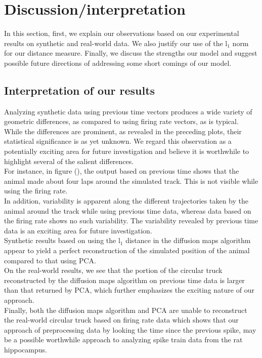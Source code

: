 \section{Discussion/interpretation}
In this section, first, we explain our observations based on our experimental
results on synthetic and real-world data. We also justify our use of the l$_{1}$ norm for our distance measure.
Finally, we discuss the strengths our model and suggest possible future directions of addressing some short comings of our model.


\subsection{Interpretation of our results}
Analyzing synthetic data using previous time vectors produces a wide variety of geometric differences, as compared to  using firing rate vectors, as is typical.
While the differences are prominent, as revealed in the preceding plots, their 
statistical significance is as yet unknown. We regard this observation as a potentially exciting area for future investigation and believe it is worthwhile 
to highlight several of the salient differences.\\

For instance, in figure (), the output based on previous time shows that 
the animal made about four laps around the  simulated track. This is not visible while using the firing rate.\\

In addition, variability is apparent along the different trajectories taken by the animal around the track while using previous time data, whereas data based on the firing rate shows no such variability. The variability revealed by previous time data is an exciting area for future investigation.\\

Synthetic results based on using the l$_{1}$ distance in the diffusion maps algorithm appear to yield a perfect reconstruction of the simulated position of the animal compared to that using PCA. \\

On the real-world results, we see that the portion of the circular truck reconstructed by the diffusion maps algorithm on previous time data is larger than that returned by PCA, which further emphasizes the exciting nature of our approach.\\

Finally, both the diffusion maps algorithm and PCA are unable to reconstruct the real-world circular truck based on firing rate data which shows that our approach of preprocessing data by looking the time since the previous spike, may be a possible worthwhile approach to analyzing spike train data from the rat hippocampus.

